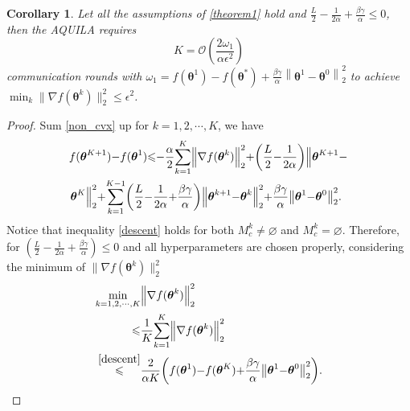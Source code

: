 \documentclass[lettersize,journal]{IEEEtran}
\newtheorem{corollary}{Corollary}
\begin{document}
\begin{corollary}
\label{corollary1}
\textit{Let all the assumptions of \cref{theorem1} hold and $\frac{L}{2}-\frac{1}{2 \alpha}+\frac{\beta\gamma}{\alpha} \leqslant 0$, then the AQUILA requires
\begin{equation}
    K = \mathcal{O}\left(\frac{2 \omega_1}{\alpha \epsilon^2}\right)
\end{equation} 
communication rounds with $\omega_1\!=\!f\left(\boldsymbol{\theta}^1\right)\!-\!f\left(\boldsymbol{\theta}^{*}\right)\!+\! \frac{\beta\gamma}{\alpha} \left\|\boldsymbol{\theta}^{1}\!-\!\boldsymbol{\theta}^{0}\right\|_2^2$ to achieve $\min _{k} \|\nabla f(\boldsymbol{\theta}^{k})\|_2^2 \leqslant \epsilon^2$.}
\end{corollary}

\begin{proof}
    Sum \eqref{non_cvx} up for $k = 1, 2, \cdots, K$, we have
\begin{equation}
\thinmuskip=0mu
\medmuskip=0mu
\thickmuskip=0mu
\begin{aligned}
    &f(\boldsymbol{\theta}^{K+1})-f(\boldsymbol{\theta}^1) \leqslant -\frac{\alpha}{2} \sum_{k=1}^{K}\left\|\nabla f(\boldsymbol{\theta}^k)\right\|_2^2 + \left( \frac{L}{2} - \frac{1}{2\alpha} \right) \left\|\boldsymbol{\theta}^{K+1} - \right.\\
    &\left.\boldsymbol{\theta}^{K}\right\|_2^2 
    + \sum_{k=1}^{K-1} \left( \frac{L}{2} - \frac{1}{2\alpha} + \frac{\beta\gamma}{\alpha}\right) \left\|\boldsymbol{\theta}^{k+1} - \boldsymbol{\theta}^{k}\right\|_2^2 + \frac{\beta\gamma}{\alpha} \left\|\boldsymbol{\theta}^{1} - \boldsymbol{\theta}^{0}\right\|_2^2.
\end{aligned}
\label{descent}
\end{equation}
Notice that inequality \eqref{descent} holds for both $M_c^k \neq \varnothing$ and $M_c^k = \varnothing$. 
Therefore, for $\left(\frac{L}{2}-\frac{1}{2 \alpha}+\frac{\beta\gamma}{\alpha} \right) \leqslant 0$ and all hyperparameters are chosen properly, considering the minimum of $\|\nabla f(\boldsymbol{\theta}^k)\|_2^2$
\begin{equation}
\thinmuskip=0mu
\medmuskip=0mu
\thickmuskip=0mu
\begin{aligned}
\min _{k=1, 2, \cdots, K} &\left\|\nabla f(\boldsymbol{\theta}^{k})\right\|_2^2 \\ \leqslant & \frac{1}{K} \sum_{k=1}^{K}\left\|\nabla f(\boldsymbol{\theta}^k)\right\|_2^2 \\
\overset{\eqref{descent}}{\leqslant} & \frac{2}{\alpha K}\left(f(\boldsymbol{\theta}^{1})-f(\boldsymbol{\theta}^{K}) + \frac{\beta\gamma}{\alpha} \left\|\boldsymbol{\theta}^{1} - \boldsymbol{\theta}^{0}\right\|_2^2 \right).

\end{aligned}
\end{equation}
\end{proof}
\end{document}

